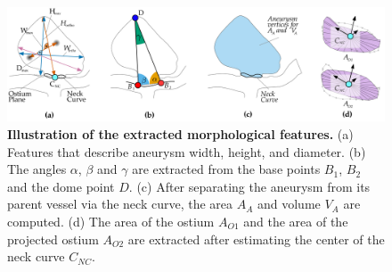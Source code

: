 \documentclass[
  oneside]{book}
\begin{document}
\begin{figure}[htb]

{\centering \includegraphics[width=1\linewidth]{figures/08-MorphParameters5} 

}

\caption{\textbf{Illustration of the extracted morphological features.} (a) Features that describe aneurysm width, height, and diameter. (b) The angles \(\alpha\), \(\beta\) and \(\gamma\) are extracted from the base points \(B_1\), \(B_2\) and the dome point \(D\). (c) After separating the aneurysm from its parent vessel via the neck curve, the area \(A_A\) and volume \(V_A\) are computed. (d) The area of the ostium \(A_{O1}\) and the area of the projected ostium \(A_{O2}\) are extracted after estimating the center of the neck curve \(C_{NC}\).}\label{fig:08-morph-parameters}
\end{figure}
\end{document}
